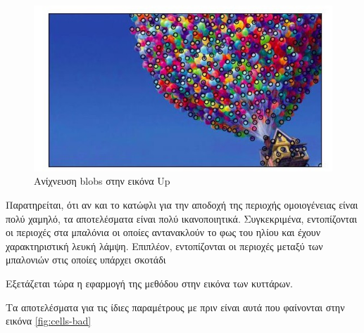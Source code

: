 \documentclass{article}
\newcommand{\eng}[1]{\foreignlanguage{english}{#1}}
\begin{document}
\begin{figure}[h]
    \centering
    \includegraphics[width=\textwidth]{../image-plots/blob-detection-up-scaled.jpg}
    \caption{Aνίχνευση \eng{blobs} στην εικόνα \eng{Up}}
    \label{fig:up-blobs}
\end{figure}
\FloatBarrier

Παρατηρείται, ότι αν και το κατώφλι για την αποδοχή της περιοχής ομοιογένειας είναι πολύ χαμηλό, τα αποτελέσματα είναι πολύ ικανοποιητικά. Συγκεκριμένα, εντοπίζονται οι περιοχές στα μπαλόνια οι οποίες αντανακλούν το φως του ηλίου και έχουν χαρακτηριστική λευκή λάμψη. Επιπλέον, εντοπίζονται οι περιοχές μεταξύ των μπαλονιών στις οποίες υπάρχει σκοτάδι

Εξετάζεται τώρα η εφαρμογή της μεθόδου στην εικόνα των κυττάρων.

Τα αποτελέσματα για τις ίδιες παραμέτρους με πριν είναι αυτά που φαίνονται στην εικόνα \ref{fig:cells-bad}
\end{document}
